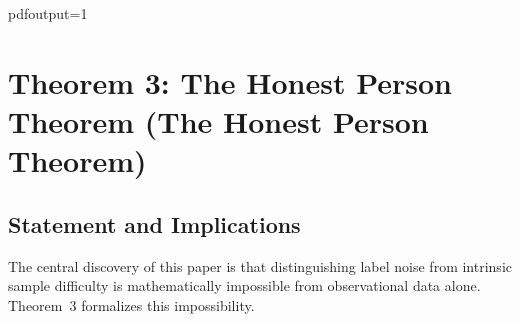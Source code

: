 pdfoutput=1

\section{Theorem 3: The Honest Person Theorem (The Honest Person Theorem)}
\label{sec:thm3}

\subsection{Statement and Implications}
\label{sec:thm3_statement}

The central discovery of this paper is that distinguishing label noise from
intrinsic sample difficulty is mathematically impossible from observational data
alone.  Theorem~3 formalizes this impossibility.

